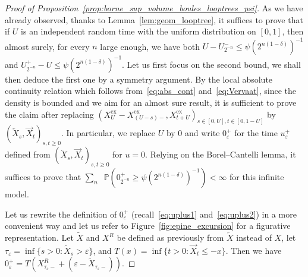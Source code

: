 \documentclass[british, a4paper,11pt]{article}
\numberwithin{equation}{section}
\theoremstyle{definition}
\renewcommand{\P}{\mathop{}\!\mathbb{P}}
\newcommand{\exc}{\mathrm{ex}}
\begin{document}
\begin{proof}[Proof of Proposition~\ref{prop:borne_sup_volume_boules_looptrees_psi}]
As we have already observed, thanks to Lemma~\ref{lem:geom_looptree}, it suffices to prove that if $U$ is an independent random time with the uniform distribution on $[0,1]$, then almost surely, for every $n$ large enough, we have both
$U-U^-_{2^{-n}} \leq \psi(2^{n(1-\delta)})^{-1}$
and
$U^+_{2^{-n}} - U \leq \psi(2^{n(1-\delta)})^{-1}$.
Let us first focus on the second bound, we shall then deduce the first one by a symmetry argument.
By the local absolute continuity relation which follows from~\eqref{eq:abs_cont} and~\eqref{eq:Vervaat}, since the density is bounded and we aim for an almost sure result, it is sufficient to prove the claim after replacing $(X^{\exc}_U-X^{\exc}_{(U-s)-}, X^{\exc}_{t+U})_{s \in [0,U], t \in [0,1-U]}$ by $(\overleftarrow{X}_s, \overrightarrow{X}_t)_{s,t \geq 0}$.
In particular, we replace $U$ by $0$ and write $0^+_{\varepsilon}$ for the time $u^+_{\varepsilon}$ defined from $(\overleftarrow{X}_s, \overrightarrow{X}_t)_{s,t \geq 0}$ for $u=0$.
Relying on the Borel--Cantelli lemma, it suffices to prove that $\sum_n \P(0^+_{2^{-n}} \geq \psi(2^{n(1-\delta)})^{-1}) < \infty$ for this infinite model.

Let us rewrite the definition of $0^+_{\varepsilon}$ (recall~\eqref{eq:uplus1} and~\eqref{eq:uplus2}) in a more convenient way and let us refer to Figure~\ref{fig:epine_excursion} for a figurative representation.
Let $\widetilde{X}$ and $X^R$ be defined as previously from $\overleftarrow{X}$ instead of $X$, let $\tau_{\varepsilon} = \inf\{s > 0 \colon \widetilde{X}_s > \varepsilon\}$, and $T(x) = \inf\{t > 0 \colon \overrightarrow{X}_t \leq -x\}$. Then we have $0^+_{\varepsilon} = T(X^R_{\tau_{\varepsilon}-} + (\varepsilon-\widetilde{X}_{\tau_{\varepsilon}-}))$.


\end{proof}
\end{document}
